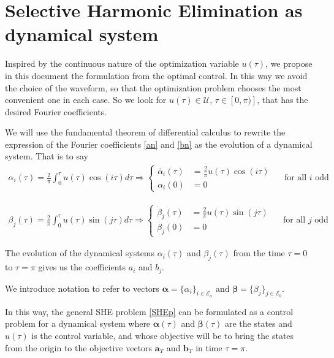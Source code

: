 \section{Selective Harmonic Elimination as dynamical system}\label{Section3}

Inspired by the continuous nature of the optimization variable $u(\tau)$, we propose in this document the formulation from the optimal control. In this way we avoid the choice of the waveform, so that the optimization problem chooses the most convenient one in each case. So we look for $u (\tau)\in \mathcal{U}$, $\tau \in [0,\pi)]$, that has the desired Fourier coefficients.

We will use the fundamental theorem of differential calculus to rewrite the expression of the Fourier coefficients \eqref{an} and \eqref{bn} as the evolution of a dynamical system. That is to say
\begin{gather}
    \alpha_i(\tau) = \frac{2}{\pi}\int_0^\tau u(\tau) \cos(i\tau)d\tau 
    \Rightarrow
    \begin{cases} \label{ode}
        \dot{\alpha_i}(\tau) & = \frac{2}{\pi}u(\tau)\cos(i\tau) \\  
        \alpha_i(0) & = 0       
    \end{cases}
    \quad\textrm{ for all } i \textrm{ odd }
\end{gather}

\begin{gather}
    \beta_j(\tau) = \frac{2}{\pi}\int_0^\tau u(\tau) \sin(j\tau)d\tau 
    \Rightarrow
    \begin{cases} \label{ode}
        \dot{\beta}_j(\tau) & = \frac{2}{\pi}u(\tau)\sin(j\tau) \\  
        \beta_j(0) & = 0       
    \end{cases}
    \quad\textrm{ for all } j \textrm{ odd }
\end{gather}

The evolution of the dynamical systems $\alpha_i(\tau)$ and $\beta_j(\tau) $ from the time $\tau = 0 $ to $\tau = \pi$ gives us the coefficients $a_i$ and $b_j$.

We introduce notation to refer to vectors $\bm{\alpha} = \{\alpha_i\}_{i\in\mathcal{E}_a}$ and $\bm{\beta} = \{\beta_j\}_{j\in\mathcal{E}_b}$.

In this way, the general SHE problem \eqref{SHEp} can be formulated as a control problem for a dynamical system where $\bm{\alpha}(\tau)$ and $\bm{\beta}(\tau)$ are the states and $u(\tau)$ is the control variable, and whose objective will be to bring the states from the origin to the objective vectors $\bm{a}_T$ and $\bm{b}_T $ in time $\tau = \pi$.

